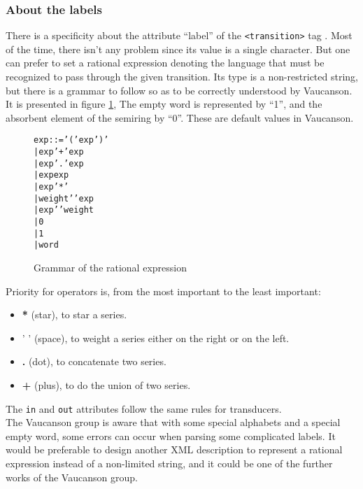 \documentclass[a4paper]{llncs}
\newcommand{\Vauc}{{\sc Vaucanson}\xspace}
\def\transitiontag{\texttt{<transition>}}
\begin{document}
\subsubsection{About the labels}

There is a specificity about the attribute ``label'' of the \transitiontag{}
tag . Most of the time, there isn't any problem since its value is a single
character. But one can prefer to set a rational expression denoting the
language that must be recognized to pass through the given transition. Its
type is a non-restricted string, but there is a grammar to follow so as to be correctly
understood by \Vauc. It is presented in figure \ref{Grammar}, The empty word
is represented by ``1'', and the absorbent element of the semiring by ``0''.
These are default values in \Vauc.

{\small

\begin{figure}[h]
  \begin{center}
\begin{alltt}
     exp ::= '(' exp ')'
         |   exp '+' exp
         |   exp '.' exp
         |   exp exp
         |   exp '*'
         |   weight ' ' exp
         |   exp ' ' weight
         |   0
         |   1
         |   word
\end{alltt}

\caption{Grammar of the rational expression}
\label{Grammar}
  \end{center}
\end{figure}
}

Priority for operators is, from the most important to the least
important:
\begin{itemize}
\item \textbf{*} (star), to star a series.
\item ' ' (space), to weight a series either on the right or on the left.
\item \textbf{.} (dot), to concatenate two series.
\item \textbf{+} (plus), to do the union of two series.
\end{itemize}

The \verb|in| and \verb|out| attributes follow the same rules for transducers.\\
The \Vauc group is aware that with some special alphabets and a special empty
word, some errors can occur when parsing some complicated labels.
It would be preferable to design another XML description to represent a rational
expression instead of a non-limited string, and it could be one of the further
works of the \Vauc{} group.
\end{document}
